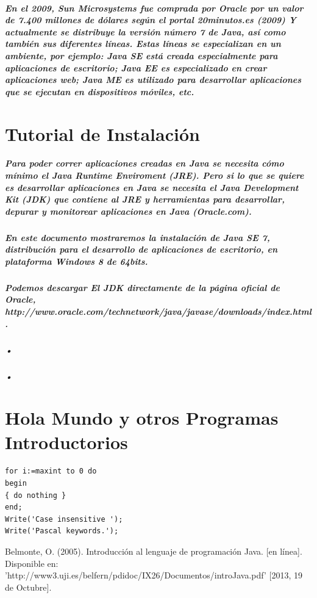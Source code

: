 \documentclass[12pt]{book} %
\begin{document}
\paragraph{En el 2009, Sun Microsystems fue comprada por Oracle por un valor de 7.400 millones de dólares según el portal 20minutos.es (2009) Y actualmente se distribuye la versión número 7 de Java, así como también sus diferentes líneas. Estas líneas se especializan en un ambiente, por ejemplo: Java SE está creada especialmente para aplicaciones de escritorio; Java EE es especializado en crear aplicaciones web; Java ME es utilizado para desarrollar aplicaciones que se ejecutan en dispositivos móviles, etc. }



\chapter{Tutorial de Instalación}
\paragraph{Para poder correr aplicaciones creadas en Java se necesita cómo mínimo el Java Runtime Enviroment (JRE). Pero si lo que se quiere es desarrollar aplicaciones en Java se necesita el Java Development Kit (JDK) que contiene al JRE y herramientas para desarrollar, depurar y monitorear aplicaciones en Java (Oracle.com).}
\paragraph{En este documento mostraremos la instalación de Java SE 7, distribución para el desarrollo de aplicaciones de escritorio, en plataforma Windows 8 de 64bits.}
\paragraph{Podemos descargar El JDK directamente de la página oficial de Oracle, http://www.oracle.com/technetwork/java/javase/downloads/index.html.}
\paragraph{•}
\paragraph{•}

\chapter{Hola Mundo y otros Programas Introductorios}
\lstset{language=Pascal}          %
\begin{lstlisting}[frame=single]  % Start your code-block
for i:=maxint to 0 do
begin
{ do nothing }
end;
Write('Case insensitive ');
Write('Pascal keywords.');
\end{lstlisting}

\begin{thebibliography}{99}
 Belmonte, O. (2005). Introducción al lenguaje de programación Java. [en línea]. Disponible en: 'http://www3.uji.es/belfern/pdidoc/IX26/Documentos/introJava.pdf' [2013, 19 de Octubre].
\end{thebibliography}
\end{document}
